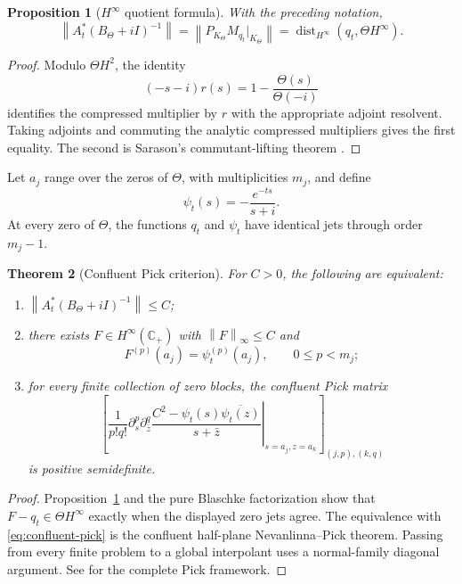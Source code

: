 \documentclass[11pt]{amsart}
\newtheorem{theorem}{Theorem}[section]
\newtheorem{proposition}[theorem]{Proposition}
\theoremstyle{definition}
\theoremstyle{remark}
\DeclareMathOperator{\dist}{dist}
\newcommand{\C}{\mathbb C}
\newcommand{\norm}[1]{\left\lVert #1\right\rVert}
\begin{document}
\begin{proposition}[$H^\infty$ quotient formula]
\label{prop:quotient-formula}
With the preceding notation,
\begin{equation}\label{eq:quotient-formula}
 \norm{A_t^*(B_\Theta+iI)^{-1}}
 =\norm{P_{K_\Theta}M_{q_t}|_{K_\Theta}}
 =\dist_{H^\infty}(q_t,\Theta H^\infty).
\end{equation}
\end{proposition}

\begin{proof}
Modulo $\Theta H^2$, the identity
\[
 (-s-i)r(s)=1-\frac{\Theta(s)}{\Theta(-i)}
\]
identifies the compressed multiplier by $r$ with the appropriate adjoint
resolvent.  Taking adjoints and commuting the analytic compressed multipliers
gives the first equality.  The second is Sarason's commutant-lifting theorem
\cite{Sarason1967}.
\end{proof}

Let $a_j$ range over the zeros of $\Theta$, with multiplicities $m_j$, and
define
\[
 \psi_t(s)=-\frac{e^{-ts}}{s+i}.
\]
At every zero of $\Theta$, the functions $q_t$ and $\psi_t$ have identical
jets through order $m_j-1$.

\begin{theorem}[Confluent Pick criterion]
\label{thm:confluent-pick}
For $C>0$, the following are equivalent:
\begin{enumerate}[label=\textup{(\roman*)}]
 \item $\norm{A_t^*(B_\Theta+iI)^{-1}}\leq C$;
 \item there exists $F\in H^\infty(\C_+)$ with $\norm F_\infty\leq C$ and
 \[
  F^{(p)}(a_j)=\psi_t^{(p)}(a_j),
  \qquad 0\leq p<m_j;
 \]
 \item for every finite collection of zero blocks, the confluent Pick matrix
 \begin{equation}\label{eq:confluent-pick}
 \left[
 \left.
 \frac1{p!q!}\partial_s^p\partial_{\bar z}^{q}
 \frac{C^2-\psi_t(s)\overline{\psi_t(z)}}{s+\bar z}
 \right|_{s=a_j,z=a_k}
 \right]_{(j,p),(k,q)}
 \end{equation}
 is positive semidefinite.
\end{enumerate}
\end{theorem}

\begin{proof}
Proposition~\ref{prop:quotient-formula} and the pure Blaschke factorization
show that $F-q_t\in\Theta H^\infty$ exactly when the displayed zero jets
agree.  The equivalence with \eqref{eq:confluent-pick} is the confluent
half-plane Nevanlinna--Pick theorem.  Passing from every finite problem to a
global interpolant uses a normal-family diagonal argument.  See
\cite{AglerMcCarthy2000} for the complete Pick framework.
\end{proof}
\end{document}
